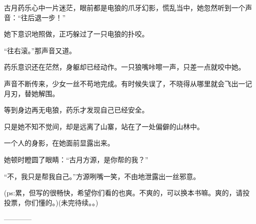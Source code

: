 \begin{this_body}
古月药乐心中一片迷茫，眼前都是电狼的爪牙幻影，慌乱当中，她忽然听到一个声音：“往后退一步！”

她下意识地照做，正巧躲过了一只电狼的扑咬。

“往右滚。”那声音又道。

药乐意识还在茫然，身躯却已经动作。一只狼嘴咔嚓一声，只差一点就咬中她。

声音不断传来，少女一丝不苟地完成。有时候失误了，不晓得从哪里就会飞出一记月刃，替她解围。

等到身边再无电狼，药乐才发现自己已经安全。

只是她不知不觉间，却是远离了山寨，站在了一处偏僻的山林中。

一个人的身影，在她面前显露出来。

她顿时瞪圆了眼睛：“古月方源，是你帮的我？”

“不，我只是帮我自己。”方源咧嘴一笑，不由地泄露出一丝邪意。

(ps:累，但写的很畅快，希望你们看的也爽。不爽的，可以换本书嘛。爽的，请投投票，你们懂的。)(未完待续。。)

------------

\end{this_body}

